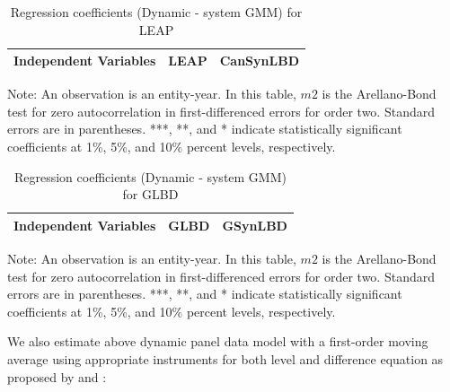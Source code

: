 \begin{table}[H]
  \centering
\begin{threeparttable}
 \caption{Regression coefficients (Dynamic - system GMM) for LEAP} \label{Dynamic - system GMM} \medskip
\renewcommand{\arraystretch}{1}
\begin{tabular}{l|c c| c c}
\toprule
\textbf{Independent Variables}&\multicolumn{2}{c|}{\textbf{LEAP}} &  \multicolumn{2}{c}{\textbf{CanSynLBD}}\\
\midrule

   \bottomrule
  \end{tabular} 
\begin{tablenotes}
\small
\item Note: An observation is an entity-year. In this table, $m2$ is the Arellano-Bond test for zero autocorrelation in first-differenced errors for order two. Standard errors are in parentheses. ***, **, and * indicate statistically significant coefficients at 1\%, 5\%, and 10\% percent levels, respectively.
 \end{tablenotes}
 \end{threeparttable}
\end{table}

\begin{table}[H]
  \centering
 \caption{Regression coefficients (Dynamic - system GMM) for GLBD} \label{Dynamic - system GMM} \medskip
\renewcommand{\arraystretch}{1}
\begin{tabular}{l|c| c}
\toprule
\textbf{Independent Variables}&\textbf{GLBD} &\textbf{GSynLBD}\\
\midrule

   \bottomrule
  \end{tabular} 
\begin{tablenotes}
\small
\item Note: An observation is an entity-year. In this table, $m2$ is the Arellano-Bond test for zero autocorrelation in first-differenced errors for order two. Standard errors are in parentheses. ***, **, and * indicate statistically significant coefficients at 1\%, 5\%, and 10\% percent levels, respectively.
 \end{tablenotes}
\end{table}

We also estimate above dynamic panel data model with a first-order moving average using appropriate instruments for both level and difference equation as proposed by \textcite{RePEc:eee:econom:v:68:y:1995:i:1:p:29-51} and \textcite{RePEc:eee:econom:v:87:y:1998:i:1:p:115-143}:

